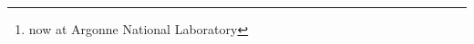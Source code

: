 \author[15]{A.~E.~Robinson}

\author[11]{S.~Sahoo}

\author[13]{O.~Scallon}

\author[11]{S.~Seth}

\author[9]{A.~Sonnenschein}

\author[15]{N.~Starinski}

\author[14]{I.~\v{S}tekl}

\author[2]{T.~Sullivan}

\author[15]{F.~Tardif}

\author[10, 13]{E.~V\'azquez-J\'auregui}

\author[7]{N.~Walkowski}

\author[13]{E.~Weima}

\author[13]{U.~Wichoski}

\author[4]{K.~Wierman}

\author[17]{Y.~Yan}

\author[15]{V.~Zacek}

\author[5]{J.~Zhang\thanks{now at Argonne National Laboratory}}
